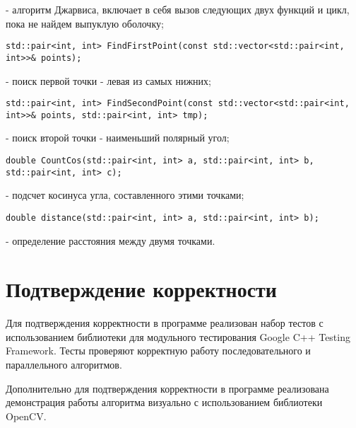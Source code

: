 \documentclass{report}
\begin{document}
- алгоритм Джарвиса, включает в себя вызов следующих двух функций и цикл, пока не найдем выпуклую оболочку;

\vspace{10pt}
\begin{lstlisting}
std::pair<int, int> FindFirstPoint(const std::vector<std::pair<int, int>>& points);
\end{lstlisting}
\vspace{-25pt}

- поиск первой точки - левая из самых нижних;

\vspace{10pt}
\begin{lstlisting}
std::pair<int, int> FindSecondPoint(const std::vector<std::pair<int, int>>& points, std::pair<int, int> tmp);
\end{lstlisting}
\vspace{-25pt}

- поиск второй точки - наименьший полярный угол;

\vspace{10pt}
\begin{lstlisting}
double CountCos(std::pair<int, int> a, std::pair<int, int> b, std::pair<int, int> c);
\end{lstlisting}
\vspace{-25pt}

- подсчет косинуса угла, составленного этими точками;

\vspace{10pt}
\begin{lstlisting}
double distance(std::pair<int, int> a, std::pair<int, int> b);
\end{lstlisting}
\vspace{-25pt}

- определение расстояния между двумя точками.

\newpage

\section{Подтверждение корректности}

Для подтверждения корректности в программе реализован набор тестов с использованием библиотеки для модульного тестирования Google C++ Testing Framework. Тесты проверяют корректную работу последовательного и параллельного алгоритмов.

\par Дополнительно для подтверждения корректности в программе реализована демонстрация работы алгоритма визуально с использованием библиотеки OpenCV.
\end{document}
